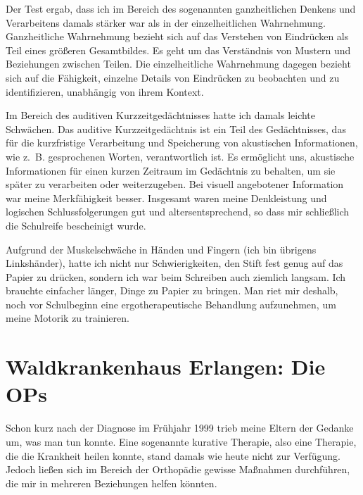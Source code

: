 \documentclass[fontsize=14pt,a4paper,headinclude,DIV=calc,automark]{scrbook}
\begin{document}
Der Test ergab, dass ich im Bereich des sogenannten ganzheitlichen Denkens und Verarbeitens damals stärker war als in der einzelheitlichen Wahrnehmung. Ganzheitliche Wahrnehmung bezieht sich auf das Verstehen von Eindrücken als Teil eines größeren Gesamtbildes. Es geht um das Verständnis von Mustern und Beziehungen zwischen Teilen. Die einzelheitliche Wahrnehmung dagegen bezieht sich auf die Fähigkeit, einzelne Details von Eindrücken zu beobachten und zu identifizieren, unabhängig von ihrem Kontext.

Im Bereich des auditiven Kurzzeitgedächtnisses hatte ich damals leichte Schwächen. Das auditive Kurzzeitgedächtnis ist ein Teil des Gedächtnisses, das für die kurzfristige Verarbeitung und Speicherung von akustischen Informationen, wie z. B. gesprochenen Worten, verantwortlich ist. Es ermöglicht uns, akustische Informationen für einen kurzen Zeitraum im Gedächtnis zu behalten, um sie später zu verarbeiten oder weiterzugeben. Bei visuell angebotener Information war meine Merkfähigkeit besser. Insgesamt waren meine Denkleistung und logischen Schlussfolgerungen gut und altersentsprechend, so dass mir schließlich die Schulreife bescheinigt wurde.

Aufgrund der Muskelschwäche in Händen und Fingern (ich bin übrigens Linkshänder), hatte ich nicht nur Schwierigkeiten, den Stift fest genug auf das Papier zu drücken, sondern ich war beim Schreiben auch ziemlich langsam. Ich brauchte einfacher länger, Dinge zu Papier zu bringen. Man riet mir deshalb, noch vor Schulbeginn eine ergotherapeutische Behandlung aufzunehmen, um meine Motorik zu trainieren.

\section{Waldkrankenhaus Erlangen: Die OPs}

Schon kurz nach der Diagnose im Frühjahr 1999 trieb meine Eltern der Gedanke um, was man tun konnte. Eine sogenannte kurative Therapie, also eine Therapie, die die Krankheit heilen konnte, stand damals wie heute nicht zur Verfügung. Jedoch ließen sich im Bereich der Orthopädie gewisse Maßnahmen durchführen, die mir in mehreren Beziehungen helfen könnten.
\end{document}
